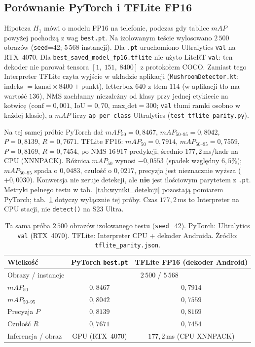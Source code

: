 \subsection{Porównanie PyTorch i TFLite FP16}\label{sec:tflite_parity}
Hipoteza $H_1$ mówi o modelu FP16 na telefonie, podczas gdy tablice $mAP$ powyżej pochodzą z wag \texttt{best.pt}. Na izolowanym teście wylosowano $2\,500$ obrazów (\texttt{seed}=42; $5\,568$ instancji). Dla \texttt{.pt} uruchomiono Ultralytics \texttt{val} na RTX~4070. Dla \texttt{best\_saved\_model\_fp16.tflite} nie użyto LiteRT \texttt{val}: ten dekoder nie parował tensora $[1,\;151,\;8400]$ z protokołem COCO. Zamiast tego Interpreter TFLite czyta wyjście w układzie aplikacji (\texttt{MushroomDetector.kt}: indeks ${}= \text{kanał}\times 8400+\text{punkt}$), letterbox $640$ z tłem $114$ (w aplikacji tło ma wartość $136$), NMS zachłanny niezależny od klasy przy jednej etykiecie na kotwicę ($\mathrm{conf}=0{,}001$, $\mathrm{IoU}=0{,}70$, $\mathrm{max\_det}=300$; \texttt{val} tłumi ramki osobno w każdej klasie), a $mAP$ liczy \texttt{ap\_per\_class} Ultralytics (\texttt{test\_tflite\_parity.py}).

Na tej samej próbie PyTorch dał $mAP_{50}=0{,}8467$, $mAP_{50\text{--}95}=0{,}8042$, $P=0{,}8139$, $R=0{,}7671$. TFLite FP16: $mAP_{50}=0{,}7914$, $mAP_{50\text{--}95}=0{,}7559$, $P=0{,}8169$, $R=0{,}7454$, po NMS $16\,917$ predykcji, średnio $177{,}2$\,ms/kadr na CPU (XNNPACK). Różnica $mAP_{50}$ wynosi $-0{,}0553$ (spadek względny $6{,}5\%$); $mAP_{50\text{--}95}$ spada o $0{,}0483$, czułość o $0{,}0217$, precyzja jest nieznacznie wyższa ($+0{,}0030$). Konwersja nie zeruje detekcji, ale \textbf{nie} jest ilościowym parytetem z \texttt{.pt}. Metryki pełnego testu w tab.~\ref{tab:wyniki_detekcji} pozostają pomiarem PyTorch; tab.~\ref{tab:tflite_parity} dotyczy wyłącznie tej próby. Czas $177{,}2$\,ms to Interpreter na CPU stacji, nie \texttt{detect()} na S23 Ultra.

\begin{table}[htbp]
 \centering
 \caption{Ta sama próba $2\,500$ obrazów izolowanego testu (\texttt{seed}=42). PyTorch: Ultralytics \texttt{val} (RTX~4070). TFLite: Interpreter CPU + dekoder Androida. Źródło: \texttt{tflite\_parity.json}.}
 \label{tab:tflite_parity}
 \begin{tabular}{|l|c|c|}
 \hline
 \textbf{Wielkość} & \textbf{PyTorch \texttt{best.pt}} & \textbf{TFLite FP16 (dekoder Android)} \\
 \hline \hline
 Obrazy / instancje & \multicolumn{2}{c|}{$2\,500$ / $5\,568$} \\
 \hline
 $mAP_{50}$ & $0{,}8467$ & $0{,}7914$ \\
 \hline
 $mAP_{50\text{--}95}$ & $0{,}8042$ & $0{,}7559$ \\
 \hline
 Precyzja $P$ & $0{,}8139$ & $0{,}8169$ \\
 \hline
 Czułość $R$ & $0{,}7671$ & $0{,}7454$ \\
 \hline
 Inferencja / obraz & GPU (RTX~4070) & $177{,}2$\,ms (CPU XNNPACK) \\
 \hline
 \end{tabular}
\end{table}

